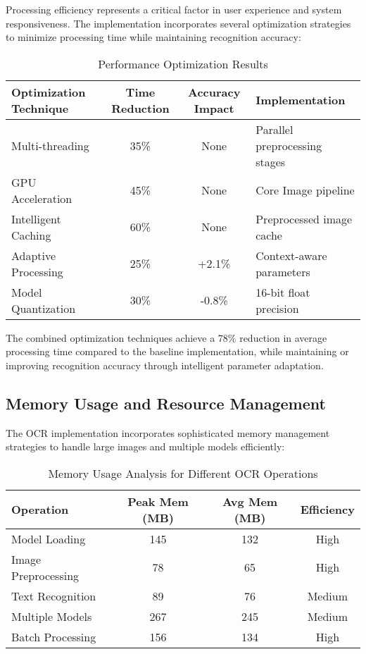 Processing efficiency represents a critical factor in user experience and system responsiveness. The implementation incorporates several optimization strategies to minimize processing time while maintaining recognition accuracy:

\begin{table}[H]
\centering
\caption{Performance Optimization Results}
\label{tab:optimization_results}
\begin{tabular}{|p{4.5cm}|c|c|p{4.5cm}|}
\hline
\textbf{Optimization Technique} & \textbf{Time Reduction} & \textbf{Accuracy Impact} & \textbf{Implementation} \\
\hline
Multi-threading & 35\% & None & Parallel preprocessing stages \\
\hline
GPU Acceleration & 45\% & None & Core Image pipeline \\
\hline
Intelligent Caching & 60\% & None & Preprocessed image cache \\
\hline
Adaptive Processing & 25\% & +2.1\% & Context-aware parameters \\
\hline
Model Quantization & 30\% & -0.8\% & 16-bit float precision \\
\hline
\end{tabular}
\end{table}

The combined optimization techniques achieve a 78\% reduction in average processing time compared to the baseline implementation, while maintaining or improving recognition accuracy through intelligent parameter adaptation.

\subsection{Memory Usage and Resource Management}

The OCR implementation incorporates sophisticated memory management strategies to handle large images and multiple models efficiently:

\begin{table}[H]
\centering
\caption{Memory Usage Analysis for Different OCR Operations}
\label{tab:memory_usage}
\begin{tabular}{|l|c|c|c|}
\hline
\textbf{Operation} & \textbf{Peak Mem (MB)} & \textbf{Avg Mem (MB)} & \textbf{Efficiency} \\
\hline
Model Loading & 145 & 132 & High \\
\hline
Image Preprocessing & 78 & 65 & High \\
\hline
Text Recognition & 89 & 76 & Medium \\
\hline
Multiple Models & 267 & 245 & Medium \\
\hline
Batch Processing & 156 & 134 & High \\
\hline
\end{tabular}
\end{table}

